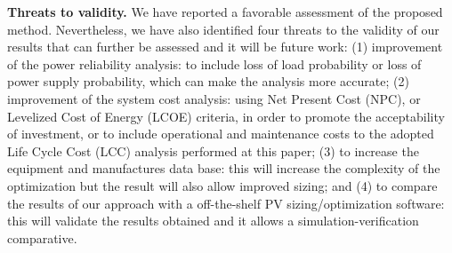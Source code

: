 \documentclass[10pt,conference]{IEEEtran}
\begin{document}
\textbf{Threats to validity.}  We have reported a favorable assessment of the proposed method. Nevertheless, we have also identified four threats to the validity of our results that can further be assessed and it will be future work: (1) improvement of the power reliability analysis: to include loss of load probability or loss of power supply probability, which can make the analysis more accurate; (2) improvement of the system cost analysis: using Net Present Cost (NPC), or Levelized Cost of Energy (LCOE) criteria, in order to promote the acceptability of investment, or to include operational and maintenance costs to the adopted Life Cycle Cost (LCC) analysis performed at this paper; (3) to increase the equipment and manufactures data base: this will increase the complexity of the optimization but the result will also allow improved sizing; and (4) to compare the results of our approach with a off-the-shelf PV sizing/optimization software: this will validate the results obtained and it allows a simulation-verification comparative.
%
{}
\end{document}
